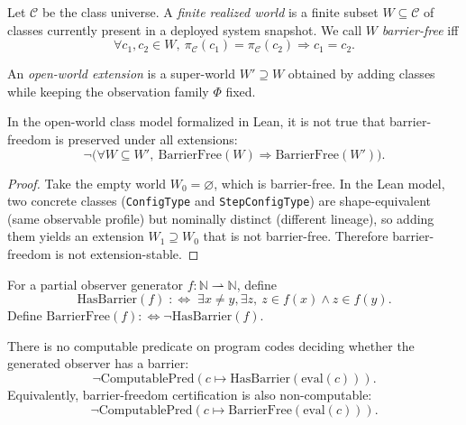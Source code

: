 \begin{definition}
Let $\mathcal{C}$ be the class universe. A \emph{finite realized world} is a finite subset $W \subseteq \mathcal{C}$ of classes currently present in a deployed system snapshot. We call $W$ \emph{barrier-free} iff
\[
\forall c_1,c_2 \in W,\ \pi_{\mathcal C}(c_1)=\pi_{\mathcal C}(c_2) \Rightarrow c_1=c_2.
\]
\end{definition}

\begin{definition}
An \emph{open-world extension} is a super-world $W' \supseteq W$ obtained by adding classes while keeping the observation family $\Phi$ fixed.
\end{definition}

\begin{theorem}\label{thm:open-world-extension-instability}
In the open-world class model formalized in Lean, it is not true that barrier-freedom is preserved under all extensions:
\[
\neg\Big(\forall W \subseteq W',\ \text{BarrierFree}(W)\Rightarrow \text{BarrierFree}(W')\Big).
\]
\end{theorem}

\begin{proof}
Take the empty world $W_0=\varnothing$, which is barrier-free. In the Lean model, two concrete classes (\texttt{ConfigType} and \texttt{StepConfigType}) are shape-equivalent (same observable profile) but nominally distinct (different lineage), so adding them yields an extension $W_1\supseteq W_0$ that is not barrier-free. Therefore barrier-freedom is not extension-stable.
\end{proof}

\begin{definition}
For a partial observer generator $f:\mathbb{N}\rightharpoonup\mathbb{N}$, define
\[
\mathrm{HasBarrier}(f)\;:\Leftrightarrow\;\exists x\neq y,\exists z,\ z\in f(x)\land z\in f(y).
\]
Define $\mathrm{BarrierFree}(f):\Leftrightarrow \neg\mathrm{HasBarrier}(f)$.
\end{definition}

\begin{theorem}\label{thm:rice-barrier}
There is no computable predicate on program codes deciding whether the generated observer has a barrier:
\[
\neg\mathrm{ComputablePred}\!\left(c\mapsto \mathrm{HasBarrier}(\mathrm{eval}(c))\right).
\]
Equivalently, barrier-freedom certification is also non-computable:
\[
\neg\mathrm{ComputablePred}\!\left(c\mapsto \mathrm{BarrierFree}(\mathrm{eval}(c))\right).
\]
\end{theorem}

